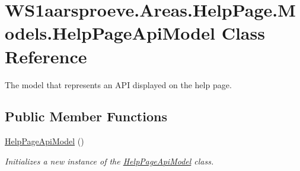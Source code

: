 \hypertarget{class_w_s1aarsproeve_1_1_areas_1_1_help_page_1_1_models_1_1_help_page_api_model}{}\section{W\+S1aarsproeve.\+Areas.\+Help\+Page.\+Models.\+Help\+Page\+Api\+Model Class Reference}
\label{class_w_s1aarsproeve_1_1_areas_1_1_help_page_1_1_models_1_1_help_page_api_model}


The model that represents an A\+P\+I displayed on the help page.  


\subsection*{Public Member Functions}
\begin{DoxyCompactItemize}
\item 
\hyperlink{class_w_s1aarsproeve_1_1_areas_1_1_help_page_1_1_models_1_1_help_page_api_model_a4d24bea559ff3c08a40bed4bd177d8d1}{Help\+Page\+Api\+Model} ()
\begin{DoxyCompactList}\small\item\em Initializes a new instance of the \hyperlink{class_w_s1aarsproeve_1_1_areas_1_1_help_page_1_1_models_1_1_help_page_api_model}{Help\+Page\+Api\+Model} class. \end{DoxyCompactList}\end{DoxyCompactItemize}
